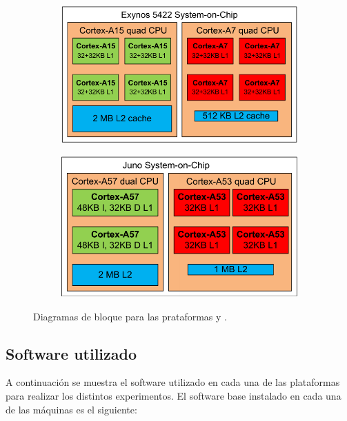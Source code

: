 \begin{figure}[t]
  \centering
    \begin{subfigure}[t]{0.45\textwidth}
      \centering
      \includegraphics[width=1\linewidth]{Figures/Exynos-2.pdf}
      \caption{\odroid}
      \label{fig:diagrama-bloques:odroid}
    \end{subfigure}
    \begin{subfigure}[t]{0.44\textwidth}
      \centering
      \includegraphics[width=1\linewidth]{Figures/Juno.pdf}
      \caption{\juno}
      \label{fig:diagrama-bloques:juno}
    \end{subfigure}  
  \caption{Diagramas de bloque para las prataformas \juno y \odroid.}
  \label{fig:diagrama-bloques}
\end{figure}



\subsection{Software utilizado}
A continuación se muestra el software utilizado en cada una de las
plataformas para realizar los distintos experimentos. El software base
instalado en cada una de las máquinas es el siguiente:

